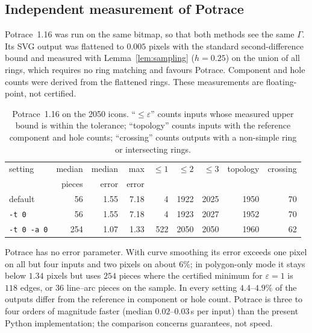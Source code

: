 \documentclass[11pt,a4paper]{article}
\theoremstyle{definition}
\theoremstyle{remark}
\begin{document}
\subsection{Independent measurement of Potrace}\label{sec:audit}

Potrace~1.16 was run on the same bitmap, so that both methods see the same
$\Gamma$. Its SVG output was flattened to $0.005$ pixels with the standard
second-difference bound and measured with Lemma~\ref{lem:sampling}
($h=0.25$) on the union of all rings, which requires no ring matching and
favours Potrace. Component and hole counts were derived from the flattened
rings. These measurements are floating-point, not certified.

\begin{table}[h]
\centering
\caption{Potrace~1.16 on the 2050 icons. ``$\le\varepsilon$'' counts inputs
whose measured upper bound is within the tolerance; ``topology'' counts inputs
with the reference component and hole counts; ``crossing'' counts outputs with
a non-simple ring or intersecting rings.}
\label{tab:potrace}
\begin{tabular}{lrrrrrrrr}
\toprule
setting & median & median & max & $\le1$ & $\le2$ & $\le3$ & topology & crossing\\
 & pieces & error & error & & & & & \\
\midrule
default & 56 & 1.55 & 7.18 & 4 & 1922 & 2025 & 1950 & 70\\
\texttt{-t 0} & 56 & 1.55 & 7.18 & 4 & 1923 & 2027 & 1952 & 70\\
\texttt{-t 0 -a 0} & 254 & 1.07 & 1.33 & 522 & 2050 & 2050 & 1960 & 62\\
\bottomrule
\end{tabular}
\end{table}

Potrace has no error parameter. With curve smoothing its error exceeds one
pixel on all but four inputs and two pixels on about $6\%$; in polygon-only
mode it stays below $1.34$ pixels but uses $254$ pieces where the certified
minimum for $\varepsilon=1$ is $118$ edges, or $36$ line--arc pieces on the
sample. In every setting $4.4$--$4.9\%$ of the outputs differ from the
reference in component or hole count. Potrace is three to four orders of
magnitude faster (median $0.02$--$0.03$\,s per input) than the present Python
implementation; the comparison concerns guarantees, not speed.
\end{document}
